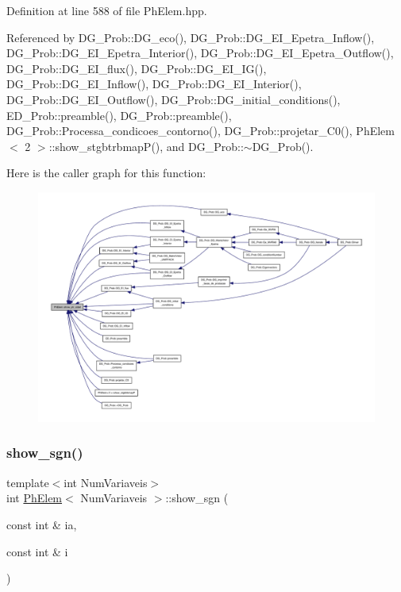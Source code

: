 Definition at line 588 of file Ph\+Elem.\+hpp.



Referenced by D\+G\+\_\+\+Prob\+::\+D\+G\+\_\+eco(), D\+G\+\_\+\+Prob\+::\+D\+G\+\_\+\+E\+I\+\_\+\+Epetra\+\_\+\+Inflow(), D\+G\+\_\+\+Prob\+::\+D\+G\+\_\+\+E\+I\+\_\+\+Epetra\+\_\+\+Interior(), D\+G\+\_\+\+Prob\+::\+D\+G\+\_\+\+E\+I\+\_\+\+Epetra\+\_\+\+Outflow(), D\+G\+\_\+\+Prob\+::\+D\+G\+\_\+\+E\+I\+\_\+flux(), D\+G\+\_\+\+Prob\+::\+D\+G\+\_\+\+E\+I\+\_\+\+I\+G(), D\+G\+\_\+\+Prob\+::\+D\+G\+\_\+\+E\+I\+\_\+\+Inflow(), D\+G\+\_\+\+Prob\+::\+D\+G\+\_\+\+E\+I\+\_\+\+Interior(), D\+G\+\_\+\+Prob\+::\+D\+G\+\_\+\+E\+I\+\_\+\+Outflow(), D\+G\+\_\+\+Prob\+::\+D\+G\+\_\+initial\+\_\+conditions(), E\+D\+\_\+\+Prob\+::preamble(), D\+G\+\_\+\+Prob\+::preamble(), D\+G\+\_\+\+Prob\+::\+Processa\+\_\+condicoes\+\_\+contorno(), D\+G\+\_\+\+Prob\+::projetar\+\_\+\+C0(), Ph\+Elem$<$ 2 $>$\+::show\+\_\+stgbtrbmap\+P(), and D\+G\+\_\+\+Prob\+::$\sim$\+D\+G\+\_\+\+Prob().

Here is the caller graph for this function\+:
\nopagebreak
\begin{figure}[H]
\begin{center}
\leavevmode
\includegraphics[width=350pt]{classPhElem_a227c31195c6832f8e36f8d507806bd54_icgraph}
\end{center}
\end{figure}
\mbox{\label{classPhElem_ab271550e1373e11cb0b1f62d3e1ea428}} 
\subsubsection{\texorpdfstring{show\+\_\+sgn()}{show\_sgn()}}
{\footnotesize\ttfamily template$<$int Num\+Variaveis$>$ \\
int \hyperlink{classPhElem}{Ph\+Elem}$<$ Num\+Variaveis $>$\+::show\+\_\+sgn (\begin{DoxyParamCaption}\item[{const int \&}]{ia,  }\item[{const int \&}]{i }\end{DoxyParamCaption})\hspace{0.3cm}{\ttfamily [inline]}}



